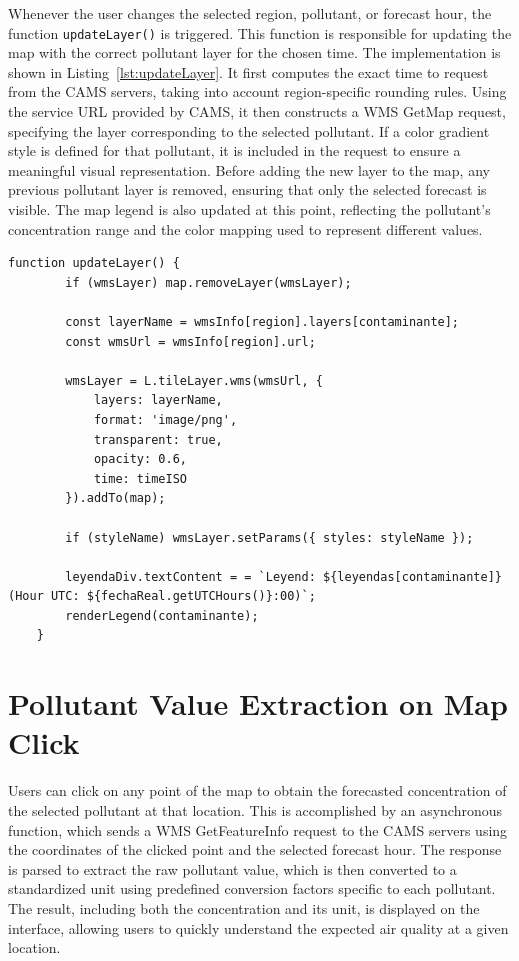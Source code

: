 Whenever the user changes the selected region, pollutant, or forecast hour, the function \texttt{updateLayer()} is triggered. This function is responsible for updating the map with the correct pollutant layer for the chosen time. The implementation is shown in Listing~\ref{lst:updateLayer}. It first computes the exact time to request from the CAMS servers, taking into account region-specific rounding rules. Using the service URL provided by CAMS, it then constructs a WMS GetMap request, specifying the layer corresponding to the selected pollutant. If a color gradient style is defined for that pollutant, it is included in the request to ensure a meaningful visual representation. Before adding the new layer to the map, any previous pollutant layer is removed, ensuring that only the selected forecast is visible. The map legend is also updated at this point, reflecting the pollutant’s concentration range and the color mapping used to represent different values.


\begin{lstlisting}[caption={Updating the map layer for the selected pollutant and hour}, label={lst:updateLayer}]
	function updateLayer() {
		if (wmsLayer) map.removeLayer(wmsLayer);
		
		const layerName = wmsInfo[region].layers[contaminante];
		const wmsUrl = wmsInfo[region].url;
		
		wmsLayer = L.tileLayer.wms(wmsUrl, {
			layers: layerName,
			format: 'image/png',
			transparent: true,
			opacity: 0.6,
			time: timeISO
		}).addTo(map);
		
		if (styleName) wmsLayer.setParams({ styles: styleName });
		
		leyendaDiv.textContent = = `Leyend: ${leyendas[contaminante]} (Hour UTC: ${fechaReal.getUTCHours()}:00)`;
		renderLegend(contaminante);
	}
\end{lstlisting}

\section{Pollutant Value Extraction on Map Click}
Users can click on any point of the map to obtain the forecasted concentration of the selected pollutant at that location. This is accomplished by an asynchronous function, which sends a WMS GetFeatureInfo request to the CAMS servers using the coordinates of the clicked point and the selected forecast hour. The response is parsed to extract the raw pollutant value, which is then converted to a standardized unit using predefined conversion factors specific to each pollutant. The result, including both the concentration and its unit, is displayed on the interface, allowing users to quickly understand the expected air quality at a given location.


